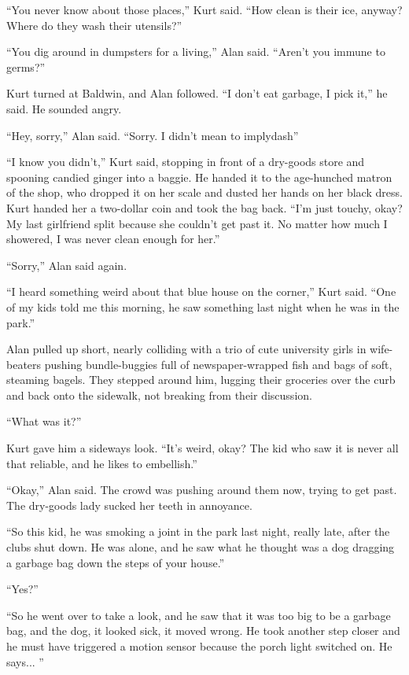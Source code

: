 ``You never know about those places,'' Kurt said.  ``How clean is
their ice, anyway?  Where do they wash their utensils?''

``You dig around in dumpsters for a living,'' Alan said.  ``Aren't you
immune to germs?''

Kurt turned at Baldwin, and Alan followed.  ``I don't eat garbage, I
pick it,'' he said.  He sounded angry.

``Hey, sorry,'' Alan said.  ``Sorry.  I didn't mean to implydash{}''

``I know you didn't,'' Kurt said, stopping in front of a dry-goods
store and spooning candied ginger into a baggie.  He handed it to the
age-hunched matron of the shop, who dropped it on her scale and dusted
her hands on her black dress.  Kurt handed her a two-dollar coin and
took the bag back.  ``I'm just touchy, okay?  My last girlfriend split
because she couldn't get past it.  No matter how much I showered, I
was never clean enough for her.''

``Sorry,'' Alan said again.

``I heard something weird about that blue house on the corner,'' Kurt
said.  ``One of my kids told me this morning, he saw something last
night when he was in the park.''

Alan pulled up short, nearly colliding with a trio of cute university
girls in wife-beaters pushing bundle-buggies full of newspaper-wrapped
fish and bags of soft, steaming bagels.  They stepped around him,
lugging their groceries over the curb and back onto the sidewalk, not
breaking from their discussion.

``What was it?''

Kurt gave him a sideways look.  ``It's weird, okay?  The kid who saw
it is never all that reliable, and he likes to embellish.''

``Okay,'' Alan said.  The crowd was pushing around them now, trying to
get past.  The dry-goods lady sucked her teeth in annoyance.

``So this kid, he was smoking a joint in the park last night, really
late, after the clubs shut down.  He was alone, and he saw what he
thought was a dog dragging a garbage bag down the steps of your
house.''

``Yes?''

``So he went over to take a look, and he saw that it was too big to be
a garbage bag, and the dog, it looked sick, it moved wrong.  He took
another step closer and he must have triggered a motion sensor because
the porch light switched on.  He says...  ''

